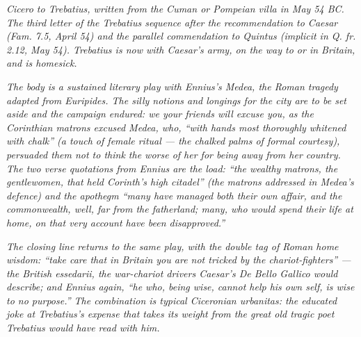 
\textit{Cicero to Trebatius, written from the Cuman or
Pompeian villa in May 54 BC. The third letter of the Trebatius
sequence after the recommendation to Caesar (\textit{Fam.}
7.5, April 54) and the parallel commendation to Quintus
(implicit in \textit{Q. fr.} 2.12, May 54). Trebatius is now
with Caesar's army, on the way to or in Britain, and is
homesick.}

\textit{The body is a sustained literary play with Ennius's
\textit{Medea}, the Roman tragedy adapted from Euripides. The
silly notions and longings for the city are to be set aside
and the campaign endured: we your friends will excuse you,
as the Corinthian matrons excused Medea, who, ``with hands
most thoroughly whitened with chalk'' (a touch of female
ritual --- the chalked palms of formal courtesy), persuaded
them not to think the worse of her for being away from her
country. The two verse quotations from Ennius are the load:
``\textit{the wealthy matrons, the gentlewomen, that held
Corinth's high citadel}'' (the matrons addressed in Medea's
defence) and the apothegm ``\textit{many have managed both
their own affair, and the commonwealth, well, far from the
fatherland; many, who would spend their life at home, on that
very account have been disapproved.}''}

\textit{The closing line returns to the same play, with the
double tag of Roman home wisdom: ``take care that in Britain
you are not tricked by the chariot-fighters'' --- the British
\textit{essedarii}, the war-chariot drivers Caesar's
\textit{De Bello Gallico} would describe; and Ennius again,
``\textit{he who, being wise, cannot help his own self, is
wise to no purpose}.''  The combination is typical Ciceronian
\textit{urbanitas}: the educated joke at Trebatius's expense
that takes its weight from the great old tragic poet
Trebatius would have read with him.}
